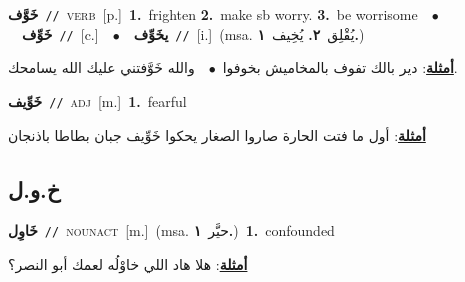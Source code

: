 \documentclass[10pt,a4paper,twoside]{article} %
\begin{document}
\begin{multicols}{2}
{\setlength\topsep{0pt}\textbf{\foreignlanguage{arabic}{خَوَّف}}\ {\color{gray}\texttt{//}\color{black}}\ \textsc{verb}\ [p.]\ \textbf{1.}~frighten  \textbf{2.}~make sb worry.  \textbf{3.}~be worrisome\ \ $\bullet$\ \ \setlength\topsep{0pt}\textbf{\foreignlanguage{arabic}{خَوِّف}}\ {\color{gray}\texttt{//}\color{black}}\ [c.]\ \ $\bullet$\ \ \setlength\topsep{0pt}\textbf{\foreignlanguage{arabic}{يخَوِّف}}\ {\color{gray}\texttt{//}\color{black}}\ [i.]\ \color{gray}(msa. \foreignlanguage{arabic}{يُقْلِق}~\foreignlanguage{arabic}{\textbf{٢.}}  \foreignlanguage{arabic}{يُخِيف}~\foreignlanguage{arabic}{\textbf{١.}})\color{black}\  \begin{flushright}\color{gray}\foreignlanguage{arabic}{\textbf{\underline{\foreignlanguage{arabic}{أمثلة}}}: دير بالك تفوف بالمخاميش بخوفوا\ $\bullet$\ \  والله خَوَّفتني عليك الله يسامحك.}\end{flushright}\color{black}} \vspace{2mm}

{\setlength\topsep{0pt}\textbf{\foreignlanguage{arabic}{خَوِّيف}}\ {\color{gray}\texttt{//}\color{black}}\ \textsc{adj}\ [m.]\ \textbf{1.}~fearful\  \begin{flushright}\color{gray}\foreignlanguage{arabic}{\textbf{\underline{\foreignlanguage{arabic}{أمثلة}}}: أول ما فتت الحارة صاروا الصغار يحكوا خَوِّيف جبان بطاطا باذنجان}\end{flushright}\color{black}} \vspace{2mm}

\vspace{-3mm}
\subsection*{\color{blue}\foreignlanguage{arabic}{خ.و.ل}\color{blue}{}} 

{\setlength\topsep{0pt}\textbf{\foreignlanguage{arabic}{خَاوِل}}\ {\color{gray}\texttt{//}\color{black}}\ \textsc{noun\textunderscore act}\ [m.]\ \color{gray}(msa. \foreignlanguage{arabic}{حيَّر}~\foreignlanguage{arabic}{\textbf{١.}})\color{black}\ \textbf{1.}~confounded\  \begin{flushright}\color{gray}\foreignlanguage{arabic}{\textbf{\underline{\foreignlanguage{arabic}{أمثلة}}}: هلا هاد اللي خاوْلُه لعمك أبو النصر؟}\end{flushright}\color{black}} \vspace{2mm}


\end{multicols}
\end{document}
